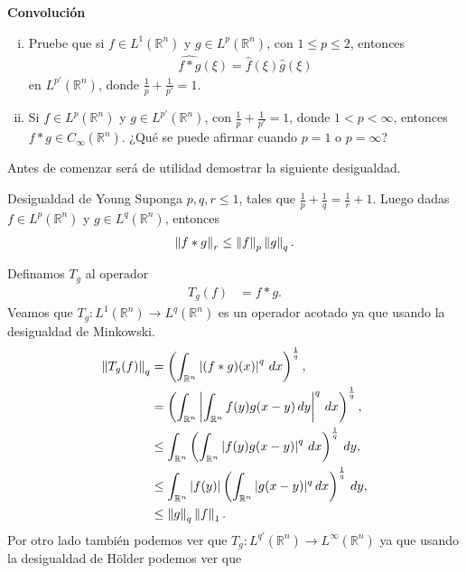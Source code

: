 \begin{homeworkProblem}
  \textbf{Convolución} 
  \begin{enumerate}[(i)]
    \item Pruebe que si $f \in L^1(\mathbb{R}^{n})$ y $g \in L^p(\mathbb{R}^{n})$, con $1 \leq p \leq 2$, entonces
      \begin{align*}
        \hat{f * g} (\xi) = \hat{f}(\xi)\hat{g}(\xi)
      \end{align*}
      en $L^{p'}(\mathbb{R}^{n})$, donde $\frac{1}{p} + \frac{1}{p'} = 1$.
    \item Si $f \in L^p(\mathbb{R}^{n})$ y $g \in L^{p'}(\mathbb{R}^{n})$, con $\frac{1}{p} + \frac{1}{p'} = 1$, donde $1 < p < \infty$, entonces $f * g \in C_\infty(\mathbb{R}^{n})$. ¿Qué se puede afirmar cuando $p = 1$ o $p = \infty$?
  \end{enumerate}
  Antes de comenzar será de utilidad demostrar la siguiente desigualdad.
  \begin{lemma}{Desigualdad de Young}
    Suponga $p,q,r\leq 1$, tales que $\frac{1}{p}+\frac{1}{q}=\frac{1}{r}+1$. Luego dadas $f\in L^{p}(\mathbb{R}^{n})$ y $g\in L^{q}(\mathbb{R}^{n})$, entonces
    \begin{align*}
      \left\|f*g\right\|_{r}\leq \left\|f\right\|_{p}\left\|g\right\|_{q}.
    \end{align*}
  \end{lemma}
  Definamos $T_g$ al operador
  \begin{align*}
    T_g(f)&=f*g.
  \end{align*}
  Veamos que $T_g:L^{1}(\mathbb{R}^{n})\to L^{q}(\mathbb{R}^{n})$ es un operador acotado ya que usando la desigualdad de Minkowski.
  \begin{align*}
    \left\|T_{g}(f)\right\|_{q}&=\left( \int_{\mathbb{R}^{n}}\left|(f*g)(x)\right|^{q}\, dx \right)^{\frac{1}{q}},\\
    &=\left( \int_{\mathbb{R}^{n}}\left|\int_{\mathbb{R}^{n}}f(y)g(x-y)\, dy\right|^{q}\, dx \right)^{\frac{1}{q}},\\
    &\leq \int_{\mathbb{R}^{n}}\left( \int_{\mathbb{R}^{n}}\left| f(y)g(x-y) \right|^{q}\, dx \right)^{\frac{1}{q}}\, dy,\\
    &\leq \int_{\mathbb{R}^{n}}|f(y)|\left(\int_{\mathbb{R}^{n}}|g(x-y)|^{q}\, dx\right)^{\frac{1}{q}}\, dy,\\
    &\leq \left\|g\right\|_{q}\left\|f\right\|_{1}.
  \end{align*}
  Por otro lado también podemos ver que $T_{g}:L^{q'}(\mathbb{R}^{n})\to L^{\infty}(\mathbb{R}^{n})$ ya que usando la desigualdad de Hölder podemos ver que 

\end{homeworkProblem}
